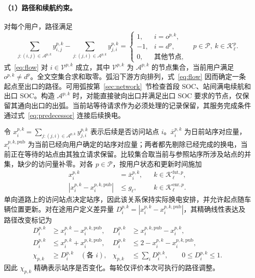 \documentclass[12pt,a4paper,UTF8]{ctexart}
\numberwithin{equation}{section}
\begin{document}
\paragraph{（1）路径和续航约束。}
对每个用户，路径满足
\begin{equation}
\sum_{j:(i,j)\in\mathcal A^{p,k}}y_{i,j}^{p,k}
-\sum_{j:(j,i)\in\mathcal A^{p,k}}y_{j,i}^{p,k}
=\begin{cases}
1,&i=o^{p,k},\\-1,&i=d^p,\\0,&\text{其他节点},
\end{cases}
\quad p\in\mathcal P,\ k\in\mathcal K_\ell^p.
\label{eq:flow}
\end{equation}
式~\eqref{eq:flow} 对 $i\in\mathcal V^{p,k}$ 成立，其中 $\mathcal V^{p,k}$ 为 $\mathcal A^{p,k}$ 的节点集合，当前用户满足 $o^{p,k}\ne d^p$。全文空集合求和取零。弧沿下游方向排列，式~\eqref{eq:flow} 因而确定一条起点至出口的路径。可用弧按第~\ref{sec:network}~节检查首段 SOC、站间满电续航和出口 SOC。构造 $\mathcal A^{p,k}$ 时，对能直接驶向出口并满足出口 SOC 要求的节点，仅保留其通向出口的出弧。当前站等待请求作为必须处理的记录保留，其服务完成条件通过式~\eqref{eq:predecessor} 连接后续换电。

令 $x_i^{p,k}=\sum_{j:(j,i)\in\mathcal A^{p,k}}y_{j,i}^{p,k}$ 表示后续是否访问站点 $i$。$\bar x_i^{p,k}$ 为日前站序对应量，$x_i^{p,k,\mathrm{pub}}$ 为当前已经向用户确定的站序对应量；两者都先剔除已经完成的换电，当前正在等待的站点由其独立请求保留。比较集合取当前与参照站序所涉及站点的并集，缺少的访问量补零。对各 $p\in\mathcal P$，按用户状态和更新时间施加
\begin{equation}
\begin{aligned}
x_i^{p,k}&=\bar x_i^{p,k},
&&k\in\mathcal K_\ell^{\mathrm{fut},p},\\
|x_i^{p,k}-x_i^{p,k,\mathrm{pub}}|&\le g_\ell,
&&k\in\mathcal K_\ell^{\mathrm{enr},p}.
\end{aligned}
\label{eq:path_freeze}
\end{equation}
单向道路上的访问站点决定站序，因此该关系保持实际换电安排，并允许起点随车辆位置更新。对在途用户定义差异量 $D_i^{p,k}=|x_i^{p,k}-x_i^{p,k,\mathrm{pub}}|$，其精确线性表达及路径改变标记为
\begin{equation}
\begin{aligned}
D_i^{p,k}&\ge x_i^{p,k}-x_i^{p,k,\mathrm{pub}},&
D_i^{p,k}&\ge x_i^{p,k,\mathrm{pub}}-x_i^{p,k},\\
D_i^{p,k}&\le x_i^{p,k}+x_i^{p,k,\mathrm{pub}},&
D_i^{p,k}&\le 2-x_i^{p,k}-x_i^{p,k,\mathrm{pub}},\\
\chi_{p,k}&\ge D_i^{p,k}\quad(\text{各 }i),&
\chi_{p,k}&\le\sum_iD_i^{p,k},\qquad 0\le D_i^{p,k}\le1.
\end{aligned}
\label{eq:path_change}
\end{equation}
因此 $\chi_{p,k}$ 精确表示站序是否变化。每轮仅评价本次可执行的路径调整。
\end{document}
